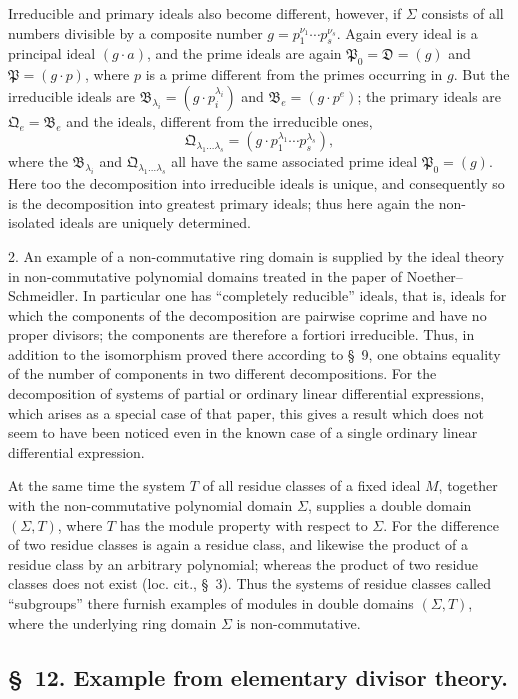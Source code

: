 \documentclass[11pt]{article}
\newcommand{\ideal}[1]{\mathfrak{#1}}
\begin{document}
Irreducible and primary ideals also become different, however, if $\Sigma$ consists of all numbers divisible by a composite number $g=p_1^{\nu_1}\cdots p_s^{\nu_s}$. Again every ideal is a principal ideal $(g\cdot a)$, and the prime ideals are again $\ideal P_0=\ideal D=(g)$ and $\ideal P=(g\cdot p)$, where $p$ is a prime different from the primes occurring in $g$. But the irreducible ideals are $\ideal B_{\lambda_i}=(g\cdot p_i^{\lambda_i})$ and $\ideal B_e=(g\cdot p^e)$; the primary ideals are $\ideal Q_e=\ideal B_e$ and the ideals, different from the irreducible ones,
\[
 \ideal Q_{\lambda_1\ldots\lambda_s}=(g\cdot p_1^{\lambda_1}\cdots p_s^{\lambda_s}),
\]
where the $\ideal B_{\lambda_i}$ and $\ideal Q_{\lambda_1\ldots\lambda_s}$ all have the same associated prime ideal $\ideal P_0=(g)$. Here too the decomposition into irreducible ideals is unique, and consequently so is the decomposition into greatest primary ideals; thus here again the non-isolated ideals are uniquely determined.

2. An example of a non-commutative ring domain is supplied by the ideal theory in non-commutative polynomial domains treated in the paper of Noether--Schmeidler. In particular one has ``completely reducible'' ideals, that is, ideals for which the components of the decomposition are pairwise coprime and have no proper divisors; the components are therefore a fortiori irreducible. Thus, in addition to the isomorphism proved there according to \S~9, one obtains equality of the number of components in two different decompositions. For the decomposition of systems of partial or ordinary linear differential expressions, which arises as a special case of that paper, this gives a result which does not seem to have been noticed even in the known case of a single ordinary linear differential expression.

At the same time the system $T$ of all residue classes of a fixed ideal $M$, together with the non-commutative polynomial domain $\Sigma$, supplies a double domain $(\Sigma,T)$, where $T$ has the module property with respect to $\Sigma$. For the difference of two residue classes is again a residue class, and likewise the product of a residue class by an arbitrary polynomial; whereas the product of two residue classes does not exist (loc. cit., \S~3). Thus the systems of residue classes called ``subgroups'' there furnish examples of modules in double domains $(\Sigma,T)$, where the underlying ring domain $\Sigma$ is non-commutative.

\subsection*{\S~12. Example from elementary divisor theory.}
\end{document}
